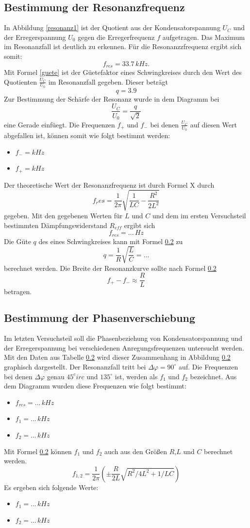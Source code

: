 \documentclass[11pt,ngerman,a4paper]{article}
\begin{document}
\subsection{Bestimmung der Resonanzfrequenz}
In Abbildung \ref{resonanz1} ist der Quotient aus der Kondensatorspannung $U_C$ und der Erregerspannung $U_0$ gegen die Erregerfrequenz $f$ aufgetragen. Das Maximum im Resonanzfall ist deutlich zu erkennen. F\"ur die Resonanzzfrequenz ergibt sich somit:
\[
	f_{res} = 33.7\,kHz.
\]
Mit Formel \ref{guete} ist der G\"uetefaktor eines Schwingkreises durch den Wert des Quotienten $\frac{U_C}{U_0}$ im Resonanzfall gegeben. Dieser betr\"agt
\[
q =  3.9
\]
Zur Bestimmung der Sch\"arfe der Resonanz wurde in dem Diagramm bei 
\[
\frac{U_C}{U_0} = \frac{q}{\sqrt{2}}
\]
eine Gerade einf\"uegt. Die Frequenzen $f_+$ und $f_-$ bei denen $\frac{U_C}{U_0}$ auf diesen Wert abgefallen ist, k\"onnen somit wie folgt bestimmt werden:
\begin{itemize}
\item $f_- = kHz$
\item $f_+ = kHz$
\end{itemize}

\noindent
Der theoretische Wert der Resonanzfrequenz ist durch Formel X durch
\[
f_res = \frac1{2\pi} \sqrt{\frac{1}{LC}-\frac{R^2}{2L^2}}
\]
gegeben. Mit den gegebenen Werten f\"ur $L$ und $C$ und dem im ersten Versuchsteil bestimmten D\"ampfungswiderstand
$R_{eff}$ ergibt sich 
\[
f_{res} = ...\,Hz
\]
Die G\"ute $q$ des eines Schwingkreises kann mit Formel \ref{} zu
\[
q = \frac{1}{R} \sqrt{\frac{L}{C}} = ... 
\]
berechnet werden. Die Breite der Resonanzkurve sollte nach Formel \ref{}
\[
f_+ - f_- \approx \frac{R}{L}
\]
betragen.
\subsection{Bestimmung der Phasenverschiebung}
Im letzten Versuchsteil soll die Phasenbeziehung von Kondensatorspannung und der Erregerspannung bei verschiedenen Anregungsfrequenzen untersucht werden. Mit den Daten aus Tabelle \ref{} wird dieser Zusammenhang in Abbildung \ref{} graphisch dargestellt. Der Resonanzfall tritt bei $\Delta \varphi = 90^\circ$ auf. Die Frequenzen bei denen $\Delta \varphi$ genau $45^circ$ und $135^\circ$ ist, werden als $f_1$ und $f_2$ bezeichnet. Aus dem Diagramm wurden diese Frequenzen wie folgt bestimmt:
\begin{itemize}
\item $f_{res} = ...\,kHz$
\item $f_{1} = ...\,kHz$
\item $f_{2} = ...\,kHz$
\end{itemize}
Mit Formel \ref{} k\"onnen $f_1$ und $f_2$ auch aus den Gr\"o\ss en $R$,$L$ und $C$ berechnet werden.
\[
f_{1,2} = \frac{1}{2 \pi} (\pm \frac{R}{2L} \sqrt{R^2/4L^2 + 1/LC}
  )
\]
Es ergeben sich folgende Werte:
\begin{itemize}
\item $f_1 = ...\,kHz$
\item $f_2 = ...\,kHz$
\end{itemize}
\end{document}
